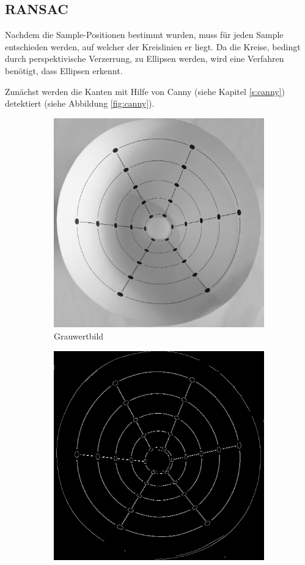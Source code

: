 \subsection{RANSAC}
Nachdem die Sample-Positionen bestimmt wurden, muss für jeden Sample entschieden werden, auf welcher der Kreislinien er liegt. Da die Kreise, bedingt durch perspektivische Verzerrung, zu  Ellipsen werden, wird eine Verfahren 
benötigt, dass Ellipsen erkennt. 

Zunächst werden die Kanten mit Hilfe von Canny (siehe Kapitel \ref{s:canny}) detektiert (siehe Abbildung \ref{fig:canny}). 

\begin{figure}[!htb]
	\centering
	\begin{subfigure}{.5\textwidth}
		\centering
		\includegraphics[width=.9\textwidth]{images/grey.png}
		\caption{Grauwertbild}
		\label{fig:beforeCanny}
	\end{subfigure}%
	\begin{subfigure}{.5\textwidth}
		\centering
		\includegraphics[width=.9\textwidth]{images/canny.png}

\end{subfigure}
\end{figure}
